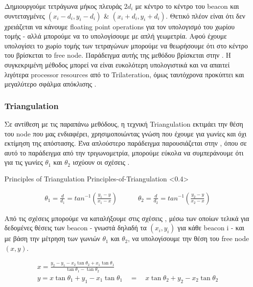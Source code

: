 Δημιουργούμε
τετράγωνα μήκος πλευράς $2d_i$ με κέντρο το κέντρο του beacon και συντεταγμένες $(x_i - d_i, y_i - d_i)$ \& $(x_i + d_i, y_i + d_i)$. 
Θετικό πλέον είναι ότι δεν χρειάζεται να κάνουμε floating point operations για τον υπολογισμό του χωρίου τομής - αλλά μπορούμε να το υπολογίσουμε
με απλή γεωμετρία. Αφού έχουμε υπολογίσει το χωρίο τομής των τετραγώνων μπορούμε να θεωρήσουμε ότι στο κέντρο του βρίσκεται το free node.
Παράδειγμα αυτής της μεθόδου βρίσκεται στην .
Η συγκεκριμένη μέθοδος μπορεί να είναι ευκολότερη υπολογιστικά και να απαιτεί λιγότερα processor resources από το Trilateration, όμως ταυτόχρονα 
προκύπτει και μεγαλύτερο σφάλμα απόκλισης \cite{wsn-Localization-systems}.   


\subsubsection{Triangulation}
Σε αντίθεση με τις παραπάνω μεθόδους, η τεχνική Triangulation εκτιμάει την θέση του node που μας ενδιαφέρει, χρησιμοποιώντας   
γνώση που έχουμε για γωνίες και όχι εκτίμηση της απόστασης. Ένα απλούστερο παράδειγμα παρουσιάζεται στην , όπου σε αυτό το παράδειγμα από την τριγωνομετρία,
μπορούμε εύκολα να συμπεράνουμε ότι για τις γωνίες $\theta_1$ και $\theta_2$ ισχύουν οι σχέσεις .

%
{Principles of Triangulation}%
{Principles-of-Triangulation}%
<0.4>

\begin{align}
	\theta_1 = \frac{d}{d_1} = tan^{-1}\left(\frac{y_1-y}{x_1-x}\right) \quad \quad \quad
	\theta_2 = \frac{d}{d_2} = tan^{-1}\left(\frac{y_2-y}{x_2-x}\right) \label{eq:angle-equations-triangulation}
\end{align}

Από τις σχέσεις  μπορούμε να καταλήξουμε στις σχέσεις  \cite{triangulation-simple-equation}, μέσω 
των οποίων τελικά για δεδομένες θέσεις των beacon - γνωστά δηλαδή τα $(x_i,y_i)$ για κάθε beacon i - και με βάση την μέτρηση των γωνιών $\theta_1$ και $\theta_2$,
να υπολογίσουμε την θέση του free node $(x,y)$.

\begin{equation}
	\begin{gathered}
		x = \frac{y_2 - y_1-  x_2\tan \theta_2 + x_1\tan \theta_1}{\tan \theta_1 - \tan \theta_2} \\[4pt]
		y = x\tan \theta_1 + y_1 - x_1\tan \theta_1 \quad = \quad x\tan \theta_2 + y_2 - x_2\tan \theta_2    
	\end{gathered}
	\label{eq:triangilation-principle}
\end{equation}

